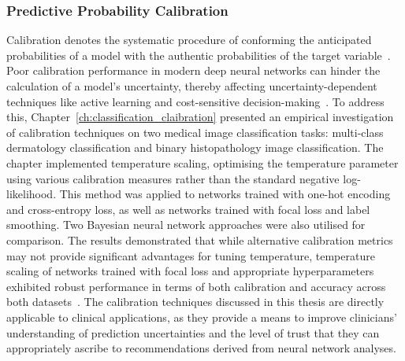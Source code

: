 \subsubsection{Predictive Probability Calibration}
Calibration denotes the systematic procedure of conforming the anticipated probabilities of a model with the authentic probabilities of the target variable~\citep{guo2017calibration}. Poor calibration performance in modern deep neural networks can hinder the calculation of a model's uncertainty, thereby affecting uncertainty-dependent techniques like active learning and cost-sensitive decision-making~\citep{carse2021robust}. To address this, Chapter~\ref{ch:classification_claibration} presented an empirical investigation of calibration techniques on two medical image classification tasks: multi-class dermatology classification and binary histopathology image classification. The chapter implemented temperature scaling, optimising the temperature parameter using various calibration measures rather than the standard negative log-likelihood. This method was applied to networks trained with one-hot encoding and cross-entropy loss, as well as networks trained with focal loss and label smoothing. Two Bayesian neural network approaches were also utilised for comparison. The results demonstrated that while alternative calibration metrics may not provide significant advantages for tuning temperature, temperature scaling of networks trained with focal loss and appropriate hyperparameters exhibited robust performance in terms of both calibration and accuracy across both datasets~\citep{carse2022calibration}. The calibration techniques discussed in this thesis are directly applicable to clinical applications, as they provide a means to improve clinicians' understanding of prediction uncertainties and the level of trust that they can appropriately ascribe to recommendations derived from neural network analyses.

